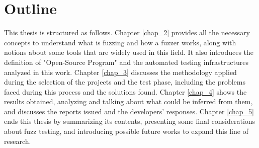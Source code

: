 \section{Outline}
This thesis is structured as follows. Chapter \ref{chap_2} provides all the necessary concepts to understand what is fuzzing and how a fuzzer works, along with notions about some tools that are widely used in this field. It also introduces the definition of "Open-Source Program" and the automated testing infrastructures analyzed in this work. Chapter \ref{chap_3} discusses the methodology applied during the selection of the projects and the test phase, including the problems faced during this process and the solutions found. Chapter \ref{chap_4} shows the results obtained, analyzing and talking about what could be inferred from them, and discusses the reports issued and the developers' responses. Chapter \ref{chap_5} ends this thesis by summarizing its contents, presenting some final considerations about fuzz testing, and introducing possible future works to expand this line of research.